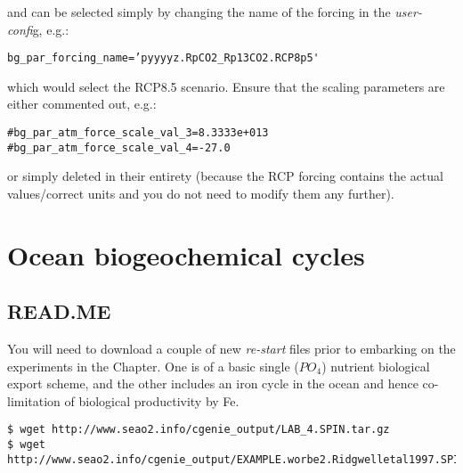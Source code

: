 \documentclass[11pt,fleqn]{book} %
\begin{document}
\noindent and can be selected simply by changing the name of the forcing in the \textit{user-confi}g, e.g.:
\vspace{-2pt}\begin{verbatim}
bg_par_forcing_name=’pyyyyz.RpCO2_Rp13CO2.RCP8p5'
\end{verbatim}\vspace{-2pt}
\noindent which would select the RCP8.5 scenario. Ensure that
the scaling parameters are either commented out, e.g.:
\vspace{-2pt}\begin{verbatim}
#bg_par_atm_force_scale_val_3=8.3333e+013
#bg_par_atm_force_scale_val_4=-27.0
\end{verbatim}\vspace{-2pt}
\noindent or simply deleted in their entirety (because the RCP forcing contains the actual values/correct units and you do not need to modify them any further).


\cleardoublepage


\chapter{Ocean biogeochemical cycles}

\hfill \break

\vspace{24mm}

\noindent


\newpage



\section*{READ.ME}

You will need to download a couple of new \textit{re-start} files prior to embarking on the experiments in the Chapter. One is of a basic single (\(PO_{4}\)) nutrient biological export scheme, and the other includes an iron cycle in the ocean and hence co-limitation of biological productivity by Fe.
\vspace{-2mm} \small
\begin{verbatim}
$ wget http://www.seao2.info/cgenie_output/LAB_4.SPIN.tar.gz
$ wget http://www.seao2.info/cgenie_output/EXAMPLE.worbe2.Ridgwelletal1997.SPIN.tar.gz
\end{verbatim} \normalsize
\end{document}

